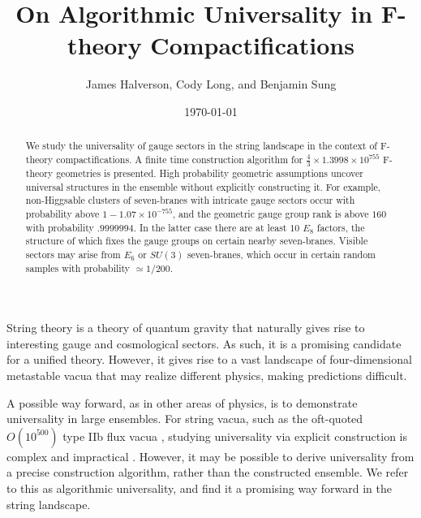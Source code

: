 \documentclass[aps,prl,twocolumn, superscriptaddress,groupedaddress,nofootinbib]{revtex4-1}
\begin{document}
\title{On Algorithmic Universality in F-theory Compactifications}
\author{James Halverson, Cody Long, and Benjamin Sung}

\date{\today}

\begin{abstract}
We study the universality of gauge sectors in the string landscape
in the context of F-theory compactifications.
A finite time construction algorithm for $\frac43 \times 1.3998 \times 10^{755}$ F-theory geometries is presented. High probability geometric
assumptions uncover universal structures in the ensemble without
explicitly constructing it. For example, non-Higgsable clusters
of seven-branes with intricate gauge sectors occur with
probability above $1-1.07\times 10^{-755}$,  and
the geometric gauge group rank is above $160$ with probability
$.9999994$. In the latter case there are at least $10$ $E_8$
factors, the structure of which fixes the gauge groups
on certain nearby seven-branes. Visible sectors may arise from $E_6$ or $SU(3)$ seven-branes, which occur
in certain random samples with probability $\simeq 1/200$.
\end{abstract}

\maketitle


String theory is a theory of quantum gravity that naturally
gives rise to interesting gauge and cosmological sectors. As
such, it is a promising candidate for a unified theory. However, it gives
rise to a vast landscape of four-dimensional metastable vacua that
may realize different physics, making predictions difficult.


A possible way forward, as in other areas of physics, is to demonstrate
universality in large ensembles. For string vacua, such as the oft-quoted
$O(10^{500})$ type IIb flux vacua
\cite{Bousso:2000xa,*Ashok:2003gk,*Denef:2004ze}, studying universality via
explicit construction is complex and impractical
\cite{Denef:2006ad,*Cvetic:2010ky}. However, it may be possible to derive
universality from a precise construction algorithm, rather than the
constructed ensemble. We refer to this as algorithmic universality, and find it a
promising way forward in the string landscape.

\end{document}
